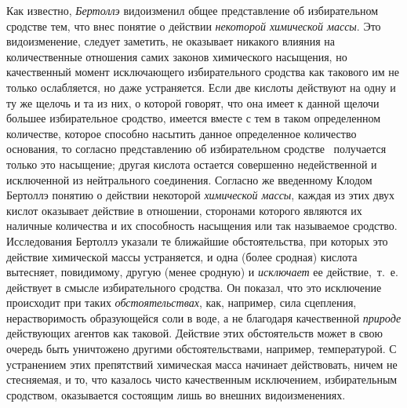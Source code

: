Как известно, {\em Бертоллэ} видоизменил общее
представление об избирательном сродстве тем, что внес понятие о действии
{\em некоторой химической массы}. Это видоизменение,
следует заметить, не оказывает никакого влияния на количественные отношения
самих законов химического насыщения, но качественный момент исключающего
избирательного сродства как такового им не только ослабляется, но даже
устраняется. Если две кислоты действуют на одну и ту же щелочь и та из них,
о которой говорят, что она имеет к данной щелочи большее избирательное
сродство, имеется вместе с тем в таком определенном количестве, которое
способно насытить данное определенное количество основания, то согласно
представлению об избирательном
сродстве~\label{bkm:Ref474666698}
получается только это насыщение; другая кислота остается совершенно
недейственной и исключенной из нейтрального соединения. Согласно же
введенному Клодом Бертоллэ понятию о действии некоторой
{\em химической массы}, каждая из этих двух кислот
оказывает действие в отношении, сторонами которого являются их наличные
количества и их способность насыщения или так называемое сродство.
Исследования Бертоллэ указали те ближайшие обстоятельства, при которых это
действие химической массы устраняется, и одна (более сродная) кислота
вытесняет, повидимому, другую (менее сродную) и
{\em исключает} ее действие,~т.~е. действует в смысле
избирательного сродства. Он показал, что это исключение происходит при
таких {\em обстоятельствах}, как, например, сила
сцепления, нерастворимость образующейся соли в воде, а не благодаря
качественной {\em природе} действующих агентов как
таковой. Действие этих обстоятельств может в свою очередь быть уничтожено
другими обстоятельствами, например, температурой. С устранением этих
препятствий химическая масса начинает действовать, ничем не стесняемая,
 и то, что
казалось чисто качественным исключением, избирательным сродством,
оказывается состоящим лишь во внешних видоизменениях.


